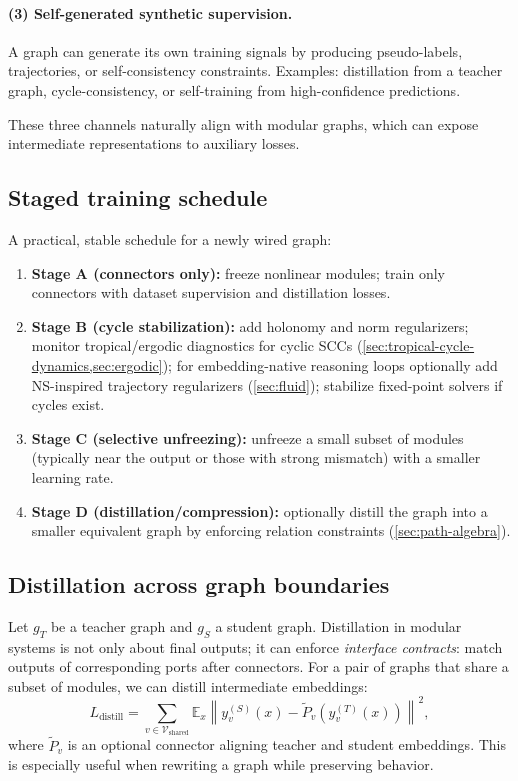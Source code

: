 \documentclass[11pt]{article}
\theoremstyle{definition}
\theoremstyle{plain}
\theoremstyle{remark}
\newcommand{\E}{\mathbb{E}}
\newcommand{\norm}[1]{\left\lVert #1 \right\rVert}
\newcommand{\mc}[1]{\mathcal{#1}}
\begin{document}
\paragraph{(3) Self-generated synthetic supervision.}
A graph can generate its own training signals by producing pseudo-labels, trajectories, or self-consistency constraints.
Examples: distillation from a teacher graph, cycle-consistency, or self-training from high-confidence predictions.

These three channels naturally align with modular graphs, which can expose intermediate representations to auxiliary losses.

\subsection{Staged training schedule}
A practical, stable schedule for a newly wired graph:
\begin{enumerate}[leftmargin=2em]
\item \textbf{Stage A (connectors only):} freeze nonlinear modules; train only connectors with dataset supervision and distillation losses.
\item \textbf{Stage B (cycle stabilization):} add holonomy and norm regularizers; monitor tropical/ergodic diagnostics for cyclic SCCs (\cref{sec:tropical-cycle-dynamics,sec:ergodic}); for embedding-native reasoning loops optionally add NS-inspired trajectory regularizers (\cref{sec:fluid}); stabilize fixed-point solvers if cycles exist.
\item \textbf{Stage C (selective unfreezing):} unfreeze a small subset of modules (typically near the output or those with strong mismatch) with a smaller learning rate.
\item \textbf{Stage D (distillation/compression):} optionally distill the graph into a smaller equivalent graph by enforcing relation constraints (\cref{sec:path-algebra}).
\end{enumerate}

\subsection{Distillation across graph boundaries}
\label{sec:distillation}

Let $g_T$ be a teacher graph and $g_S$ a student graph.
Distillation in modular systems is not only about final outputs; it can enforce \emph{interface contracts}:
match outputs of corresponding ports after connectors.
For a pair of graphs that share a subset of modules, we can distill intermediate embeddings:
\[
L_{\mathrm{distill}} = \sum_{v\in\mc{V}_\mathrm{shared}} \E_x \norm{y_v^{(S)}(x) - \tilde P_v(y_v^{(T)}(x))}^2,
\]
where $\tilde P_v$ is an optional connector aligning teacher and student embeddings.
This is especially useful when rewriting a graph while preserving behavior.
\end{document}
